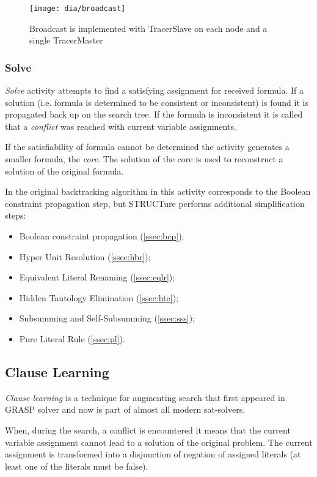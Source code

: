 \begin{figure}[h]
  \centering
  \texttt{[image: dia/broadcast]}
  \caption{Broadcast is implemented with
  TracerSlave on each node and a single TracerMaster}
  \label{fig:broadcast}
\end{figure}


\subsubsection{Solve}
\label{sssec:solve}

\emph{Solve} activity attempts to find a satisfying assignment for
received formula. If a solution (i.e.  formula is determined to be
consistent or inconsistent) is found it is propagated back up on
the search tree. If the formula is inconsistent it is called that
a \emph{conflict} was reached with current variable assignments.

If the satisfiability of formula cannot be determined the activity
generates a smaller formula, the \emph{core}. The solution of the
core is used to reconstruct a solution of the original
formula.

In the original backtracking algorithm in
\cite{Davis:1960:CPQ:321033.321034} this activity corresponds to
the Boolean constraint propagation step, but STRUCTure performs
additional simplification steps:
\begin{itemize}
  \item Boolean constraint propagation (\ref{ssec:bcp});
  \item Hyper Unit Resolution (\ref{ssec:hbr});
  \item Equivalent Literal Renaming (\ref{ssec:eqlr});
  \item Hidden Tautology Elimination (\ref{ssec:hte});
  \item Subsumming and Self-Subsumming (\ref{ssec:sss});
  \item Pure Literal Rule (\ref{ssec:pl}).
\end{itemize}


\subsection{Clause Learning}
\label{ssec:learning}

\emph{Clause learning} is a technique for augmenting search that
first appeared in GRASP solver \cite{Marques-silva99grasp:a} and
now is part of almost all modern sat-solvers.

When, during the search, a conflict is encountered it means that
the current variable assignment cannot lead to a solution of the
original problem. The current assignment is transformed into a
disjunction of negation of assigned literals (at least one of the
literals must be false).

